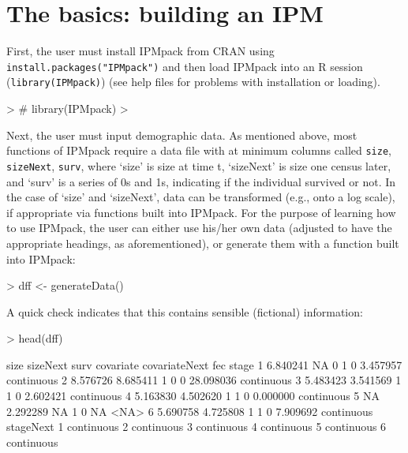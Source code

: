 \documentclass{article}
\begin{document}
\section{The basics: building an IPM}

First, the user must install IPMpack from CRAN using
{\tt install.packages("IPMpack")} and then load IPMpack into an R session
({\tt library(IPMpack)}) (see help files for problems with installation or loading). 

\begin{Schunk}
\begin{Sinput}
> # library(IPMpack)
> 
\end{Sinput}
\end{Schunk}
Next, the user must input demographic data. As mentioned above, most functions of IPMpack require a data file with at minimum columns called {\tt size}, {\tt sizeNext}, {\tt surv}, where `size' is size at time t, `sizeNext' is size one census later, and `surv' is a series of 0s and 1s, indicating if the individual survived or not. In the case of `size' and `sizeNext', data can be transformed (e.g., onto a log scale), if appropriate via functions built into IPMpack. For the purpose of learning how to use IPMpack, the user can either use his/her own data (adjusted to have the appropriate headings, as aforementioned), or generate them with a function built into IPMpack:

\begin{Schunk}
\begin{Sinput}
> dff <- generateData()
\end{Sinput}
\end{Schunk}
A quick check indicates that this contains sensible (fictional) information: 
\begin{Schunk}
\begin{Sinput}
> head(dff)
\end{Sinput}
\begin{Soutput}
      size sizeNext surv covariate covariateNext       fec      stage
1 6.840241       NA    0         1             0  3.457957 continuous
2 8.576726 8.685411    1         0             0 28.098036 continuous
3 5.483423 3.541569    1         1             0  2.602421 continuous
4 5.163830 4.502620    1         1             0  0.000000 continuous
5       NA 2.292289   NA         1             0        NA       <NA>
6 5.690758 4.725808    1         1             0  7.909692 continuous
   stageNext
1 continuous
2 continuous
3 continuous
4 continuous
5 continuous
6 continuous
\end{Soutput}
\end{Schunk}
\end{document}
